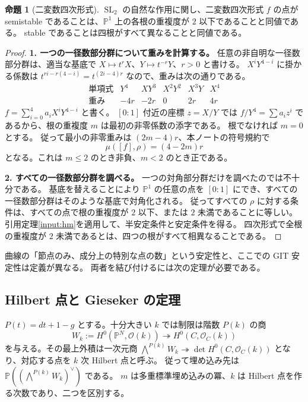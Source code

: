 \documentclass[dvipdfmx,a4paper,11pt]{article}
\theoremstyle{definition}
\newtheorem{prop}[thm]{命題}
\newcommand{\PP}{\mathbb P}\newcommand{\HH}{\mathbb H}
\newcommand{\OO}{\mathcal O}\newcommand{\MM}{\mathcal M}\newcommand{\TT}{\mathcal T}
\DeclareMathOperator{\SL}{SL}\DeclareMathOperator{\PGL}{PGL}\DeclareMathOperator{\PSL}{PSL}
\begin{document}
\begin{prop}[二変数四次形式]\label{prop:quarticgit}
$\SL_2$ の自然な作用に関し、二変数四次形式 $f$ の点が semistable であることは、$\PP^1$ 上の各根の重複度が $2$ 以下であることと同値である。
stable であることは四根がすべて異なることと同値である。
\end{prop}
\begin{proof}
\textbf{1. 一つの一径数部分群について重みを計算する。}
任意の非自明な一径数部分群は、適当な基底で
$X\mapsto t^rX$、$Y\mapsto t^{-r}Y$、$r>0$ と書ける。
$X^iY^{4-i}$ に掛かる係数は $t^{ri-r(4-i)}=t^{(2i-4)r}$ なので、重みは次の通りである。
\[
\begin{array}{c|ccccc}
\text{単項式}&Y^4&XY^3&X^2Y^2&X^3Y&X^4\\\hline
\text{重み}&-4r&-2r&0&2r&4r
\end{array}
\]
$f=\sum_{i=0}^4a_iX^iY^{4-i}$ と書く。
$[0:1]$ 付近の座標 $z=X/Y$ では $f/Y^4=\sum a_i z^i$ であるから、根の重複度 $m$ は最初の非零係数の添字である。
根でなければ $m=0$ とする。
従って最小の非零重みは $(2m-4)r$、本ノートの符号規約で
\[
\mu([f],\rho)=(4-2m)r
\]
となる。これは $m\le2$ のとき非負、$m<2$ のとき正である。

\textbf{2. すべての一径数部分群を調べる。}
一つの対角部分群だけを調べたのでは不十分である。
基底を替えることにより $\PP^1$ の任意の点を $[0:1]$ にでき、すべての一径数部分群はそのような基底で対角化される。
従ってすべての $\rho$ に対する条件は、すべての点で根の重複度が $2$ 以下、または $2$ 未満であることに等しい。
引用定理\ref{input:hm}を適用して、半安定条件と安定条件を得る。
四次形式で全根の重複度が $2$ 未満であるとは、四つの根がすべて相異なることである。
\end{proof}
曲線の「節点のみ、成分上の特別な点の数」という安定性と、ここでの GIT 安定性は定義が異なる。
両者を結び付けるには次の定理が必要である。

\subsection{Hilbert 点と Gieseker の定理}
$P(t)=dt+1-g$ とする。十分大きい $k$ では制限は階数 $P(k)$ の商
\[
W_k:=H^0(\PP^N,\OO(k))\twoheadrightarrow H^0(C,\OO_C(k))
\]
を与える。その最上外積は一次元商
$\bigwedge^{P(k)}W_k\twoheadrightarrow\det H^0(C,\OO_C(k))$ となり、対応する点を $k$ 次 Hilbert 点と呼ぶ。
従って埋め込み先は $\PP((\bigwedge^{P(k)}W_k)^\vee)$ である。
$m$ は多重標準埋め込みの冪、$k$ は Hilbert 点を作る次数であり、二つを区別する。
\end{document}
